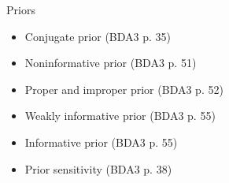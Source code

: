 \documentclass[english,t]{beamer}
\DeclareMathOperator{\Bin}{Bin}
\DeclareMathOperator{\Beta}{Beta}
\DeclareMathOperator{\BetaBinomial}{Beta-Binomial}
\begin{document}
  

\begin{frame}{Priors}

  \begin{itemize}
  \item Conjugate prior (BDA3 p. 35)
  \item Noninformative prior (BDA3 p. 51)
  \item Proper and improper prior (BDA3 p. 52)
  \item Weakly informative prior (BDA3 p. 55)
  \item Informative prior (BDA3 p. 55)
  \item Prior sensitivity (BDA3 p. 38)
  \end{itemize}

\end{frame}
\end{document}

